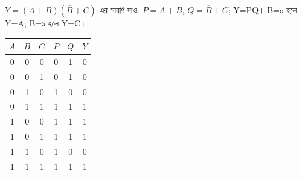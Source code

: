 \par\smallskip\noindent\begin{minipage}{\linewidth}
$Y=(A+B)(\overline B+C)$-এর সারণি দাও.
\chThreeAnswer $P=A+B$, $Q=\overline B+C$; Y=PQ। B=০ হলে Y=A; B=১ হলে Y=C।
\begin{center}\begin{tabular}{|c|c|c|c|c|c|}\hline
$A$ & $B$ & $C$ & $P$ & $Q$ & $Y$\\\hline
0 & 0 & 0 & 0 & 1 & 0\\\hline
0 & 0 & 1 & 0 & 1 & 0\\\hline
0 & 1 & 0 & 1 & 0 & 0\\\hline
0 & 1 & 1 & 1 & 1 & 1\\\hline
1 & 0 & 0 & 1 & 1 & 1\\\hline
1 & 0 & 1 & 1 & 1 & 1\\\hline
1 & 1 & 0 & 1 & 0 & 0\\\hline
1 & 1 & 1 & 1 & 1 & 1\\\hline
\end{tabular}\end{center}

\end{minipage}\par\smallskip
{}

